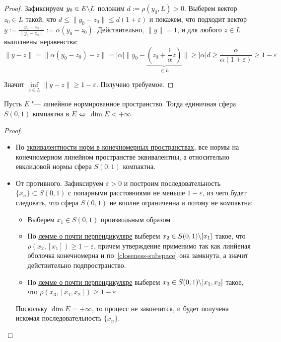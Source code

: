 \begin{proof}
		Зафиксируем $y_0 \in E \backslash L$ положим $d := \rho(y_0, L) > 0$. Выберем вектор $z_0 \in L$ такой, что $d \leqslant \|y_0 - z_0\| \leqslant d(1 + \varepsilon)$ и покажем, что подходит вектор $y := \frac{y_0 - z_0}{\|y_0 - z_0\|}:= \alpha (y_0-z_0)$. Действительно, $\|y\| = 1$, и для любого $z \in L$ выполнены неравенства:
		\[\|y - z\| = \big\|\alpha(y_0 - z_0) - z\big\|=|\alpha| \big\| y_0 - \underbrace{\left(z_0 + \frac1{\alpha} z\right)}_{\in L} \big\| \geqslant |\alpha|d \geqslant \frac{\alpha}{\alpha(1+\varepsilon)} \geqslant 1 - \varepsilon\]

		Значит $\inf\limits_{z \in L}\|y - z\| \geqslant 1 - \varepsilon$. Получено требуемое.
\end{proof}

\begin{theorem}[Рисса]\label{thm4.1}
	Пусть $E$ "--- линейное нормированное пространство. Тогда единичная сфера $S(0, 1)$ компактна в $E$ $\Leftrightarrow$ $\dim E < +\infty$.
\end{theorem}

\begin{proof}~
	\begin{itemize}
		\item[$\la$] По \hyperref[normequiv]{эквивалентности норм в конечномерных пространствах}, все нормы на конечномерном линейном пространстве эквивалентны, а относительно евклидовой нормы сфера $S(0, 1)$ компактна.
  
  		\item[$\ra$] От противного. Зафиксируем $\varepsilon > 0$ и построим последовательность $\{x_n\} \subset S(0, 1)$ с попарными расстояниями не меньше $1 - \varepsilon$, из чего будет следовать, что сфера $S(0, 1)$ не вполне ограниченна и потому не компактна:
		\begin{itemize}
			\item[$\bullet$] Выберем $x_1 \in S(0, 1)$ произвольным образом
			\item[$\bullet$] По \hyperref[almostperp]{лемме о почти перпендикуляре} выберем $x_2 \in S(0, 1) \backslash [x_1]$ такое, что $\rho(x_2, [x_1]) \geqslant 1- \varepsilon$, причем утверждение применимо так как линйеная оболочка конечномерна и по~\ref{closeness-subspace} она замкнута, а значит действительно подпространство.
			\item[$\bullet$] По \hyperref[almostperp]{лемме о почти перпендикуляре} выберем $x_3 \in S(0, 1) \backslash [x_1, x_2]$ такое, что $\rho(x_3, [x_1, x_2]) \geqslant 1- \varepsilon$
		\end{itemize}

		Поскольку $\dim E = + \infty$, то процесс не закончится, и будет получена искомая последовательность $\{x_n\}$.\qedhere
	\end{itemize}
\end{proof}